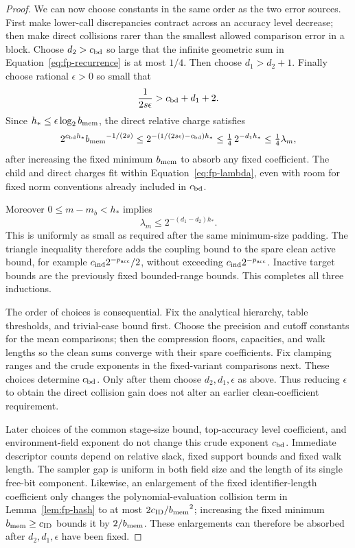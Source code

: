 \documentclass[11pt]{article}
\numberwithin{equation}{section}
\theoremstyle{definition}
\theoremstyle{remark}
\begin{document}
\begin{proof}
We can now choose constants in the same order as the two error sources. First make lower-call discrepancies contract across an accuracy level decrease; then make direct collisions rarer than the smallest allowed comparison error in a block. Choose ${d}_2>{c_{\rm bd}}$ so large that the infinite geometric sum in
Equation~\eqref{eq:fp-recurrence} is at most $1/4$.  Then choose
${d}_1>{d}_2+1$.  Finally choose rational $\epsilon>0$ so small that
\begin{equation}
                  \frac1{2s\epsilon}>{c_{\rm bd}}+{d}_1+2.
 \label{eq:fp-epsilon}
\end{equation}
Since $h_*\le\epsilon\log_2{b_{\rm mem}}$, the direct relative charge satisfies
\[
 2^{{c_{\rm bd}} h_*}{b_{\rm mem}}^{-1/(2s)}
 \le 2^{-(1/(2s\epsilon)-{c_{\rm bd}})h_*}
 \le\tfrac14\,2^{-{d}_1h_*}
 \le\tfrac14\lambda_{m},
\]
after increasing the fixed minimum ${b_{\rm mem}}$ to absorb any fixed coefficient.
The child and direct charges fit within Equation~\eqref{eq:fp-lambda},
even with room for fixed norm conventions already included in ${c_{\rm bd}}$.

Moreover $0\le {m}-{m}_b<h_*$ implies
\[
              \lambda_{m}\le2^{-({d}_1-{d}_2)h_*}.
\]
This is uniformly as small as required after the same minimum-size
padding.  The triangle inequality therefore adds the coupling bound to
the spare clean active bound, for example ${c_{\rm ind}}2^{-{p_{\rm acc}}}/2$, without
exceeding ${c_{\rm ind}}2^{-{p_{\rm acc}}}$.  Inactive target bounds are the previously fixed
bounded-range bounds.  This completes all three inductions.

The order of choices is consequential.  Fix the analytical hierarchy,
table thresholds, and trivial-case bound first.  Choose the precision
and cutoff constants for the mean comparisons; then the compression
floors, capacities, and walk lengths so the clean sums converge with
their spare coefficients.  Fix clamping ranges and the crude exponents
in the fixed-variant comparisons next.  These choices determine ${c_{\rm bd}}$.
Only after them choose ${d}_2,{d}_1,\epsilon$ as above.  Thus reducing
$\epsilon$ to obtain the direct collision gain does not alter an
earlier clean-coefficient requirement.

Later choices of the common stage-size bound, top-accuracy level coefficient,
and environment-field exponent do not change this crude exponent ${c_{\rm bd}}$.
Immediate descriptor counts depend on relative slack, fixed support
bounds and fixed walk length.  The sampler gap is uniform in both
field size and the length of its single free-bit component.  Likewise,
an enlargement of the fixed identifier-length coefficient only changes
the polynomial-evaluation collision term in Lemma~\ref{lem:fp-hash} to at most
$2c_{\mathrm{ID}}/{b_{\rm mem}}^2$; increasing the fixed minimum
${b_{\rm mem}}\ge c_{\mathrm{ID}}$ bounds it by $2/{b_{\rm mem}}$.  These enlargements can
therefore be absorbed after ${d}_2,{d}_1,\epsilon$ have been fixed.
\end{proof}
\end{document}
